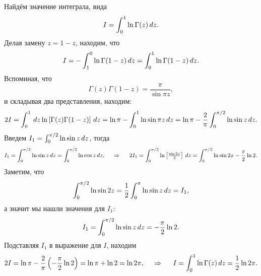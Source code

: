 Найдём значение интеграла,  вида
\begin{equation*}
    I = \int_{0}^{1}  \ln \Gamma(z) \, d z.
\end{equation*}
Делая замену $z = 1 - z$, находим, что
\begin{equation*}
    I = - \int_{1}^{0} \ln \Gamma(1-z) \, d z = \int_{0}^{1} \ln \Gamma(1-z) \, d z.
\end{equation*}
Вспоминая, что
\begin{equation*}
    \Gamma(z) \Gamma(1-z) = \frac{\pi}{\sin \pi z},
\end{equation*}
и складывая два представления, находим:
\begin{equation*}
    2 I = \int_{0}^{1} \, d z \ln \left[
        \Gamma(z) \Gamma(1-z)
    \right] \, d z = \ln \pi - \int_{0}^{1} \ln \sin \pi z \, d z
     = \ln \pi - \frac{2}{\pi} \int_{0}^{\pi/2} \ln \sin z \, d z
    .
\end{equation*}
Введем $I_1 = \int_{0}^{\pi/2} \ln \sin  z \, d z$, тогда
\begin{equation*}
    I_1 = \int_{0}^{\pi/2} \ln \sin  z \, d z = \int_{0}^{\pi/2} \ln \cos z \, d z,
    \hspace{0.5cm} \Rightarrow \hspace{0.5cm}
    2 I_1 = \int_{0}^{\pi/2} \ln\left[\tfrac{\sin 2z}{2}\right] \, d z = 
    \int_{0}^{\pi/2} \ln \sin 2 x - \frac{\pi}{2} \ln 2.
\end{equation*}
Заметим, что
\begin{equation*}
    \int_{0}^{\pi/2} \ln \sin 2 z = \frac{1}{2}\int_{0}^{\pi} \ln \sin z \, d z = I_1,
\end{equation*}
а значит мы нашли значения для $I_1$:
\begin{equation*}
    I_1 = \int_{0}^{\pi/2} \ln \sin  z \, d z = - \frac{\pi}{2} \ln 2.
\end{equation*}
Подставляя $I_1$ в выражение для $I$, находим
\begin{equation*}
    2 I = \ln \pi - \frac{2}{\pi} \left(-\frac{\pi}{2} \ln 2\right) = \ln \pi + \ln 2 = \ln 2 \pi,
    \hspace{0.5cm} \Rightarrow \hspace{0.5cm}
    I = \int_{0}^{1} \ln \Gamma(z) \, d z = \frac{1}{2}\ln 2 \pi.
\end{equation*}




